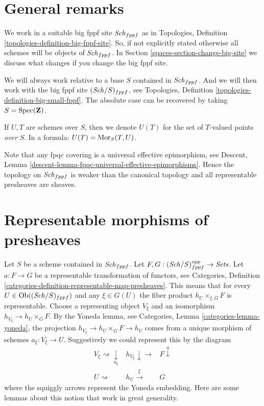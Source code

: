 \section{General remarks}
\label{spaces-section-general}
We work in a suitable big fppf site $\mathit{Sch}_{fppf}$
as in Topologies, Definition \ref{topologies-definition-big-fppf-site}.
So, if not explicitly stated otherwise all schemes will be objects
of $\mathit{Sch}_{fppf}$.
In Section \ref{spaces-section-change-big-site} we discuss what
changes if you change the big fppf site.

\medskip\noindent
We will always work relative to a base $S$ contained in $\mathit{Sch}_{fppf}$.
And we will then work with the big fppf site $(\mathit{Sch}/S)_{fppf}$,
see Topologies, Definition \ref{topologies-definition-big-small-fppf}.
The absolute case can be recovered by taking
$S = \operatorname{Spec}(\mathbf{Z})$.

\medskip\noindent
If $U, T$ are schemes over $S$, then we denote
$U(T)$ for the set of $T$-valued points {\it over} $S$.
In a formula: $U(T) = \operatorname{Mor}_S(T, U)$.

\medskip\noindent
Note that any fpqc covering is a universal effective epimorphism, see
Descent, Lemma \ref{descent-lemma-fpqc-universal-effective-epimorphisms}.
Hence the topology on $\mathit{Sch}_{fppf}$
is weaker than the canonical topology and all representable presheaves
are sheaves.

\section{Representable morphisms of presheaves}
\label{spaces-section-representable}
Let $S$ be a scheme contained in $\mathit{Sch}_{fppf}$.
Let $F, G : (\mathit{Sch}/S)_{fppf}^{opp} \to \textit{Sets}$.
Let $a : F \to G$ be a representable transformation of functors, see
Categories,
Definition \ref{categories-definition-representable-map-presheaves}.
This means that for every
$U \in \operatorname{Ob}((\mathit{Sch}/S)_{fppf})$ and
any $\xi \in G(U)$ the fiber product $h_U \times_{\xi, G} F$ is representable.
Choose a representing object $V_\xi$ and an isomorphism
$h_{V_\xi} \to h_U \times_G F$.
By the Yoneda lemma, see Categories, Lemma \ref{categories-lemma-yoneda},
the projection $h_{V_\xi} \to h_U \times_G F \to h_U$ comes from a unique
morphism of schemes $a_\xi : V_\xi \to U$.
Suggestively we could represent this by the diagram
$$
\begin{array}{ccc}V_\xi \rightsquigarrow\underset{a_\xi}{\downarrow} & h_{V_\xi} \downarrow\longrightarrow & F \overset{a}{\downarrow} \\ U \rightsquigarrow & h_U \overset{\xi}{\longrightarrow} & G\end{array}
$$
where the squiggly arrows represent the Yoneda embedding.
Here are some lemmas about this notion that work in great generality.


